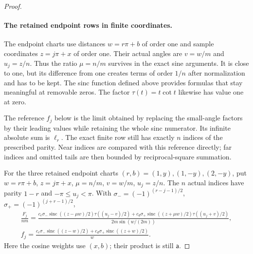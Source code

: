 \begin{proof}
\paragraph{The retained endpoint rows in finite coordinates.}
The endpoint charts use distances $w=r\pi+b$ of order one and
sample coordinates $z=j\pi+x$ of order one. Their actual angles are
$v=w/m$ and $u_j=z/n$. Thus the ratio $\mu=n/m$ survives in the
exact sine arguments. It is close to one, but its difference from one
creates terms of order $1/n$ after normalization and has to be kept.
The sinc function defined above provides formulas that stay meaningful
at removable zeros.
The factor $\tau(t)=t\cot t$ likewise has value one at zero.

The reference $f_j$ below is the limit obtained by replacing the
small-angle factors by their leading values while retaining the whole
sinc numerator. Its infinite absolute sum is $\ell_r$. The exact finite
row still has exactly $n$ indices of the prescribed parity. Near
indices are compared with this reference directly; far indices and
omitted tails are then bounded by reciprocal-square summation.

For the three retained endpoint charts $(r,b)=(1,y),(1,-y),(2,-y)$,
put $w=r\pi+b$, $z=j\pi+x$, $\mu=n/m$, $v=w/m$, $u_j=z/n$.
The $n$ actual indices have parity $1-r$ and $-\pi\leq u_j<\pi$.
With $\sigma_-=(-1)^{(r-j-1)/2}$, $\sigma_+=(-1)^{(j+r-1)/2}$,
\begin{equation}\label{uc:sinc-row}
 \begin{aligned}
 \frac{F_j}{nm}=
 \frac{c_e\sigma_-\operatorname{sinc}((z-\mu w)/2)\tau((u_j-v)/2)
       +c_d\sigma_+\operatorname{sinc}((z+\mu w)/2)\tau((u_j+v)/2)}
 {2m\sin(w/(2m))},\\
 f_j=\frac{c_e\sigma_-\operatorname{sinc}((z-w)/2)
                  +c_d\sigma_+\operatorname{sinc}((z+w)/2)}w.
 \end{aligned}
\end{equation}
Here the cosine weights use $(x,b)$; their product is still $\mathsf{a}$.


\end{proof}
